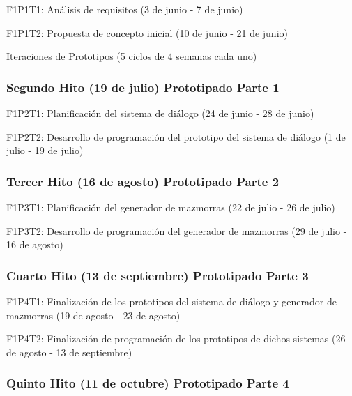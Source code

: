 \begin{compactitem}
\item F1P1T1: Análisis de requisitos (3 de junio - 7 de junio)
\item F1P1T2: Propuesta de concepto inicial (10 de junio - 21 de junio)
\end{compactitem}

Iteraciones de Prototipos (5 ciclos de 4 semanas cada uno)

\subsubsection{Segundo Hito (19 de julio) Prototipado Parte 1}

\begin{compactitem}
  \item F1P2T1: Planificación del sistema de diálogo (24 de junio - 28 de junio)
  \item F1P2T2: Desarrollo de programación del prototipo del sistema de diálogo (1 de julio - 19 de julio)
\end{compactitem}

\subsubsection{Tercer Hito (16 de agosto) Prototipado Parte 2}

\begin{compactitem}
  \item F1P3T1: Planificación del generador de mazmorras (22 de julio - 26 de julio)
  \item F1P3T2: Desarrollo de programación del generador de mazmorras (29 de julio - 16 de agosto)
\end{compactitem}

\subsubsection{Cuarto Hito (13 de septiembre) Prototipado Parte 3}

\begin{compactitem}
\item F1P4T1: Finalización de los prototipos del sistema de diálogo y generador de mazmorras (19 de agosto - 23 de agosto)
\item F1P4T2: Finalización de programación de los prototipos de dichos sistemas (26 de agosto - 13 de septiembre)
\end{compactitem}

\subsubsection{Quinto Hito (11 de octubre) Prototipado Parte 4}

